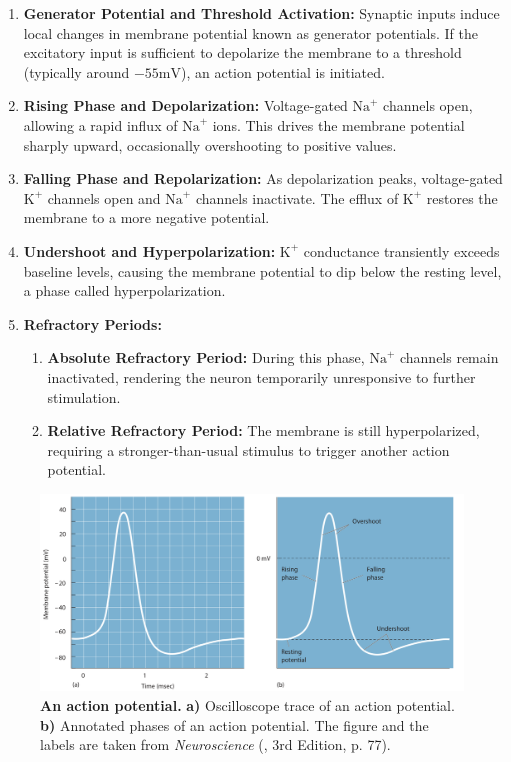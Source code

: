 \begin{enumerate}
    \item \textbf{Generator Potential and Threshold Activation:} Synaptic inputs induce local changes in membrane potential known as generator potentials. If the excitatory input is sufficient to depolarize the membrane to a threshold (typically around $-55 \text{mV}$), an action potential is initiated.
    
    \item \textbf{Rising Phase and Depolarization:} Voltage-gated $\text{Na}^{+}$ channels open, allowing a rapid influx of $\text{Na}^{+}$ ions. This drives the membrane potential sharply upward, occasionally overshooting to positive values.
    
    \item \textbf{Falling Phase and Repolarization:} As depolarization peaks, voltage-gated $\text{K}^{+}$ channels open and $\text{Na}^{+}$ channels inactivate. The efflux of $\text{K}^{+}$ restores the membrane to a more negative potential.
    
    \item \textbf{Undershoot and Hyperpolarization:} $\text{K}^{+}$ conductance transiently exceeds baseline levels, causing the membrane potential to dip below the resting level, a phase called hyperpolarization.

    \item \textbf{Refractory Periods:}
    \begin{enumerate}
        \item \textbf{Absolute Refractory Period:} During this phase, $\text{Na}^{+}$ channels remain inactivated, rendering the neuron temporarily unresponsive to further stimulation.
        \item \textbf{Relative Refractory Period:} The membrane is still hyperpolarized, requiring a stronger-than-usual stimulus to trigger another action potential.
    \end{enumerate}
\end{enumerate}

\begin{figure}
    \centering
    \includegraphics[width=\linewidth]{img/action_potential.pdf}
    \caption{\textbf{An action potential.} \textbf{a)} Oscilloscope trace of an action potential. \textbf{b)} Annotated phases of an action potential. The figure and the labels are taken from \emph{Neuroscience} (\citet{bear2020neuroscience}, 3rd Edition, p. 77).}
    \label{fig:action_potential}
\end{figure}

